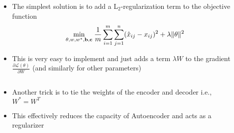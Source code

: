 \begin{frame}
    \begin{columns}
        \begin{overlayarea}{\textwidth}{\textheight}
            \vspace{5pt}
        
        \end{overlayarea}
    
        \begin{overlayarea}{\textwidth}{\textheight}
            \begin{itemize}\justifying
                \item<1-> The simplest solution is to add a L$_2$-regularization term to the objective function
                \begin{align*}
                    \min\limits_{\theta,w,w^*,\mathbf{b},\mathbf{c}} \hspace{0.3mm}
                    \frac{1}{m}\sum\limits_{i=1}^m\sum\limits_{j=1}^n(\hat{x}_{ij}-x_{ij})^2 + \lambda \|\theta\|^2
                \end{align*}
                \item<2-> This is very easy to implement and just adds a term $\lambda W$ to the gradient $\frac{\partial \mathscr{L(\theta)}}{\partial W}$ (and similarly for other parameters)
            \end{itemize}
        \end{overlayarea}
    \end{columns}
\end{frame}




\begin{frame}
    \begin{columns}
        \begin{overlayarea}{\textwidth}{\textheight}
            \vspace{5pt}
            
        \end{overlayarea}

        \begin{overlayarea}{\textwidth}{\textheight}
            \begin{itemize}\justifying
                \item<1-> Another trick is to tie the weights of the encoder and decoder \pause i.e., $W^*=W^{T}$
                \item<3->  This effectively reduces the capacity of Autoencoder and acts as a regularizer
            \end{itemize}
        \end{overlayarea}
    \end{columns}
\end{frame}
